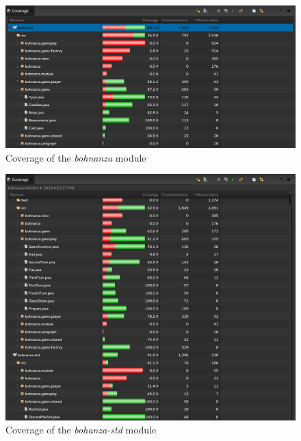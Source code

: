 \begin{figure}[h!]
    \includegraphics[width=\textwidth]{../img/coverage}
    \caption{Coverage of the \emph{bohnanza} module}
    \label{fig:test:coverage}
\end{figure}

\begin{figure}[h!]
    \includegraphics[width=\textwidth]{../img/coverage-std}
    \caption{Coverage of the \emph{bohanza-std} module}
    \label{fig:test:coverage-std}
\end{figure}
